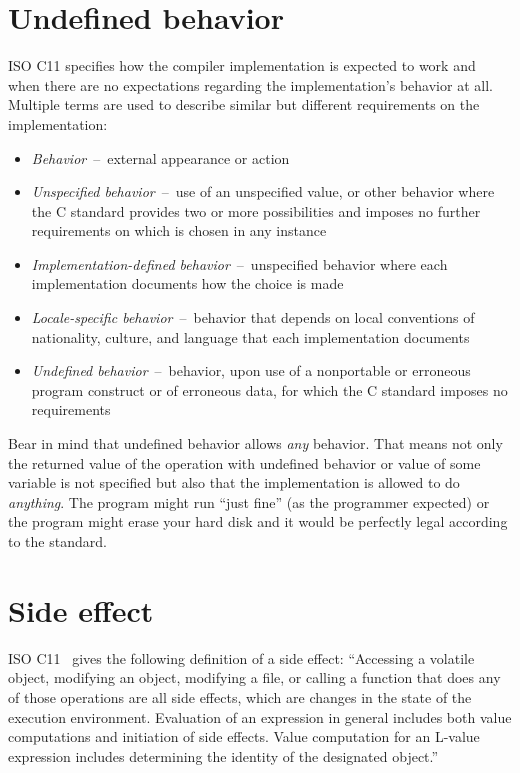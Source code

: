 \section{Undefined behavior}
ISO C11 specifies how the compiler implementation is expected to work and when there are no expectations regarding the implementation's behavior at all. Multiple terms are used to describe similar but different requirements on the implementation:~\cite{WG14N1570}
\begin{itemize}
    \item \emph{Behavior}~--~external  appearance or action
    \item \emph{Unspecified behavior}~--~use of an unspecified value, or other behavior where the C standard provides two or more possibilities and imposes no further requirements on which is chosen in any instance
    \item \emph{Implementation-defined behavior}~--~unspecified behavior where each implementation documents how the choice is made
    \item \emph{Locale-specific behavior}~--~behavior that depends on local conventions of nationality, culture, and language that each implementation documents
    \item \emph{Undefined behavior}~--~behavior, upon use of a nonportable or erroneous program construct or of erroneous data, for which the C standard imposes no requirements
\end{itemize}

Bear in mind that undefined behavior allows \emph{any} behavior. That means not only the returned value of the operation with undefined behavior or value of some variable is not specified but also that the implementation is allowed to do \emph{anything}. The program might run ``just fine'' (as the programmer expected) or the program might erase your hard disk and it would be perfectly legal according to the standard.

\section{Side effect}
ISO C11~\cite{WG14N1570} gives the following definition of a side effect: ``Accessing a volatile object, modifying an object, modifying a file, or calling a function that does any of those operations are all side effects, which are changes in the state of the execution environment. Evaluation of an expression in general includes both value computations and initiation of side effects. Value computation for an L-value expression includes determining the identity of the designated object.''

